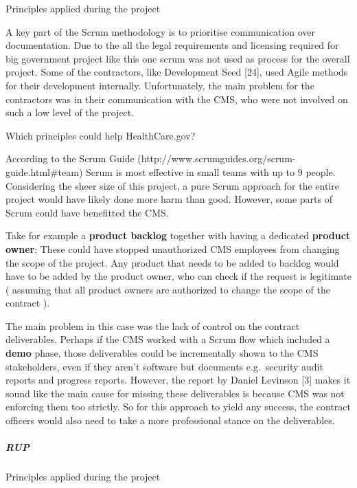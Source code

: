 \documentclass[]{article}
\let\oldsubparagraph\subparagraph
\renewcommand{\subparagraph}[1]{\oldsubparagraph{#1}\mbox{}}
\begin{document}
Principles applied during the project

A key part of the Scrum methodology is to prioritise communication over
documentation. Due to the all the legal requirements and licensing
required for big government project like this one scrum was not used as
process for the overall project. Some of the contractors, like
Development Seed {[}24{]}, used Agile methods for their development
internally. Unfortunately, the main problem for the contractors was in
their communication with the CMS, who were not involved on such a low
level of the project.

Which principles could help HealthCare.gov?

According to the Scrum Guide
(http://www.scrumguides.org/scrum-guide.html\#team) Scrum is most
effective in small teams with up to 9 people. Considering the sheer size
of this project, a pure Scrum approach for the entire project would have
likely done more harm than good. However, some parts of Scrum could have
benefitted the CMS.

Take for example a \textbf{product backlog} together with having a
dedicated \textbf{product owner}; These could have stopped unauthorized
CMS employees from changing the scope of the project. Any product that
needs to be added to backlog would have to be added by the product
owner, who can check if the request is legitimate ( assuming that all
product owners are authorized to change the scope of the contract ).

The main problem in this case was the lack of control on the contract
deliverables. Perhaps if the CMS worked with a Scrum flow which included
a \textbf{demo} phase, those deliverables could be incrementally shown
to the CMS stakeholders, even if they aren't software but documents
e.g.~security audit reports and progress reports. However, the report by
Daniel Levinson {[}3{]} makes it sound like the main cause for missing
these deliverables is because CMS was not enforcing them too strictly.
So for this approach to yield any success, the contract officers would
also need to take a more professional stance on the deliverables.

\subparagraph{RUP}\label{rup}

Principles applied during the project
\end{document}
